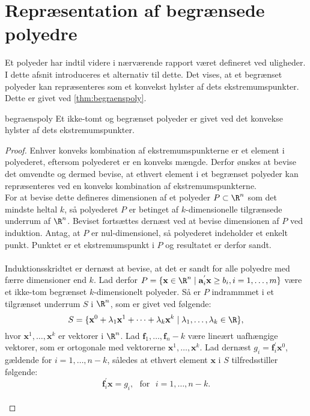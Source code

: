 \section{Repræsentation af begrænsede polyedre}
%
Et polyeder har indtil videre i nærværende rapport været defineret ved uligheder. 
I dette afsnit introduceres et alternativ til dette. 
Det vises, at et begrænset polyeder kan repræsenteres som et konvekst hylster af dets ekstremumspunkter. 
Dette er givet ved \ref{thm:begraenspoly}. \\
\begin{thm}{}{begraenspoly}
Et ikke-tomt og begrænset polyeder er givet ved det konvekse hylster af dets ekstremumspunkter.
\end{thm}
\begin{proof}
Enhver konveks kombination af ekstremumspunkterne er et element i polyederet, eftersom polyederet er en konveks mængde. 
Derfor ønskes at bevise det omvendte og dermed bevise, at ethvert element i et begrænset polyeder kan repræsenteres ved en konveks kombination af ekstremumspunkterne. \\
For at bevise dette defineres dimensionen af et polyeder $P \subset \R^n$ som det mindste heltal $k$, så polyederet $P$ er betinget af $k$-dimensionelle tilgrænsede underrum af $\R^n$. 
Beviset fortsættes dernæst ved at bevise dimensionen af $P$ ved induktion. 
Antag, at $P$ er nul-dimensionel, så polyederet indeholder et enkelt punkt. 
Punktet er et ekstremumspunkt i $P$ og resultatet er derfor sandt. \\\\
Induktionsskridtet er dernæst at bevise, at det er sandt for alle polyedre med færre dimensioner end $k$. Lad derfor $P = \{\textbf{x} \in \R^n \mid \mathbf{a}_{i}^{'} \textbf{x} \geq b_i, i=1,\ldots,m\}$ være et ikke-tom begrænset $k$-dimensionelt polyeder. 
Så er $P$ indrammmet i et tilgrænset underrum $S$ i $\R^n$, som er givet ved følgende: \\
$$S = \{\textbf{x}^0+\lambda_1\textbf{x}^1+\cdots+\lambda_k\textbf{x}^k \mid \lambda_1,\ldots,\lambda_k \in \R\},$$
hvor $\textbf{x}^1,\ldots,\textbf{x}^k$ er vektorer i $\R^n$. 
Lad $\textbf{f}_1,\ldots,\textbf{f}_n-k$ være lineært uafhængige vektorer, som er ortogonale med vektorerne $\textbf{x}^1,\ldots,\textbf{x}^k$. 
Lad dernæst $g_i=\mathbf{f}_{i}^{'}\textbf{x}^0$, gældende for $i=1,\ldots,n-k$, således at ethvert element $\textbf{x}$ i $S$ tilfredsstiller følgende: \\
$$\mathbf{f}_{i}^{'}\textbf{x}=g_i, \text{     } \text{for} \text{     } i=1,\ldots,n-k.$$ \\

\end{proof}

